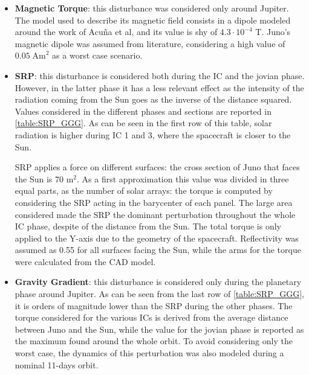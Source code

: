 \begin{itemize}
    \item \textbf{Magnetic Torque}: this disturbance was considered only around Jupiter. The model used to describe its magnetic field consists in a dipole modeled around the work of Acuña et al\cite{jupiter_mag_field}, and its value is shy of $4.3\cdot 10^{-4}$ T. Juno's magnetic dipole was assumed from literature, considering a high value of $0.05 \; \textrm{Am}^2$ as a worst case scenario.

    \item \textbf{SRP}: this disturbance is considered both during the IC and the jovian phase. However, in the latter phase it has a less relevant effect as the intensity of the radiation coming from the Sun goes as the inverse of the distance squared. Values considered in the different phases and sections are reported in \autoref{table:SRP_GGG}. 
    As can be seen in the first row of this table, solar radiation is higher during IC 1 and 3, where the spacecraft is closer to the Sun. 
    
    SRP applies a force on different surfaces: the cross section of Juno that faces the Sun is 70 $\textrm{m}^2$. As a first approximation this value was divided in three equal parts, as the number of solar arrays: the torque is computed by considering the SRP acting in the barycenter of each panel. The large area considered made the SRP the dominant perturbation throughout the whole IC phase, despite of the distance from the Sun. The total torque is only applied to the Y-axis due to the geometry of the spacecraft. Reflectivity was assumed as 0.55 for all surfaces facing the Sun, while the arms for the torque were calculated from the CAD model.

    \item \textbf{Gravity Gradient}: this disturbance is considered only during the planetary phase around Jupiter. As can be seen from the last row of \autoref{table:SRP_GGG}, it is orders of magnitude lower than the SRP during the other phases. The torque considered for the various ICs is derived from the average distance between Juno and the Sun, while the value for the jovian phase is reported as the maximum found around the whole orbit. To avoid considering only the worst case, the dynamics of this perturbation was also modeled during a nominal 11-days orbit.
    

\end{itemize}
